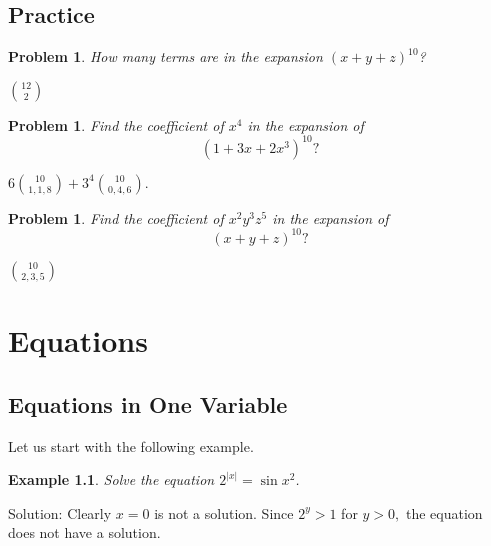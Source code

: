 \documentclass[11pt, openany]{book}
\theoremstyle{change} \theoremheaderfont{\blue\sffamily\bfseries}
\newtheorem{exa}[thm]{Example}
\newtheorem{pro}[thm]{Problem}
\theoremstyle{nonumberplain} \theoremheaderfont{\sffamily\bfseries}
\def\binom#1#2{{#1\choose#2}}
\newcommand{\í}{\'{\i}}
\begin{document}
\section*{Practice}\begin{multicols}{2}\columnseprule 1pt \columnsep 25pt

\begin{pro} How many terms are in the expansion $(x + y + z)^{10}$?
\begin{answer}
$\binom{12}{2}$
\end{answer}
\end{pro}

\begin{pro} Find the coefficient of $x^4$ in the expansion of $$(1 + 3x +
2x^3)^{10} ? $$
\begin{answer} $6\binom{10}{1, 1, 8} + 3^4
\binom{10}{0, 4, 6}.$ \end{answer}
\end{pro}
\begin{pro} Find the coefficient of $x^2 y^3 z^5$ in the expansion of $$(x +
y + z)^{10}?$$ \begin{answer} $\binom{10}{2, 3, 5}$  \end{answer}

\end{pro}
\end{multicols}


\chapter{Equations}
\section{Equations in One Variable}

Let us start with the following example.
\begin{exa}
Solve the equation $2^{|x|} = \sin x^2$.

\end{exa}
Solution: Clearly $x = 0$ is not a solution. Since $2^y > 1$ for
$y > 0,$ the equation does not have a solution.
\end{document}
